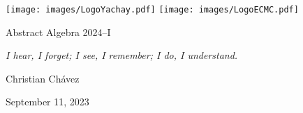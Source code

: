 \pagebreak

\begin{center}
    \texttt{[image: images/LogoYachay.pdf]} 
        \hfill
    \texttt{[image: images/LogoECMC.pdf]}
\end{center}

\pdfbookmark{\currfilebase}{\currfilebase}

\begin{center}
    {\LARGE
    Abstract Algebra 2024--I\\
    \vspace{0.25cm}
    \textbf{\thetitle{}}}

    \emph{I hear, I forget;
    I see, I remember;
    I do, I understand.}
    
    Christian Chávez
    

    September 11, 2023
\end{center}


